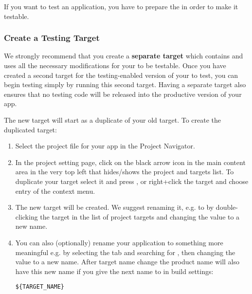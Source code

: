 
If you want to test an  application, you have to prepare the \gdaut{} in order to make it testable.


\subsubsection{Create a Testing Target}

We strongly recommend that you create a \textbf{separate target} which contains and uses all the necessary modifications for your \gdaut{} to be testable. 
Once you have created a second target for the testing-enabled version of your \gdaut{} to test, you can begin testing simply by running this second target. Having a separate target also ensures that no testing code will be released into the productive version of your app. 

The new target will start as a duplicate of your old target. To create the duplicated target:
\begin{enumerate}
\item Select the project file for your app in the Project Navigator.
\item In the project setting page, click on the black arrow icon  in the main content area in the very top left that hides/shows the project and targets list. 
To duplicate your target select it and press , or right+click the target and choose  entry of the context menu. 
\item The new target will be created. We suggest renaming it, e.g. to   by double-clicking the target in the list of project targets and changing the value to a new name.
\item You can also (optionally) rename your  application to something more meaningful e.g.  by selecting the  tab and searching for , then changing the value to a new name. 
After target name change the product name will also have this new name if you give the next name to  in build settings:
\begin{verbatim}
${TARGET_NAME} 
\end{verbatim}
\end{enumerate}


